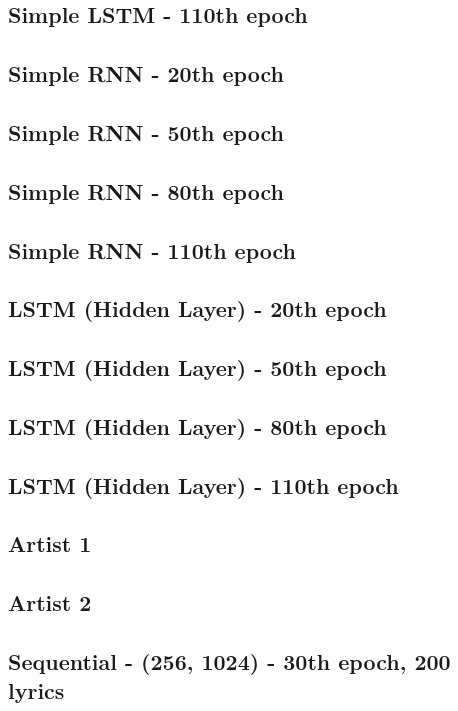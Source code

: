 \documentclass[conference]{IEEEtran}
\begin{document}
\subsection{Simple LSTM - 110th epoch}\label{LSTM110}
\subsection{Simple RNN - 20th epoch}\label{RNN20}
\subsection{Simple RNN - 50th epoch}\label{RNN50}
\subsection{Simple RNN - 80th epoch}\label{RNN80}
\subsection{Simple RNN - 110th epoch}\label{RNN110}
\subsection{LSTM (Hidden Layer) - 20th epoch}\label{HID20}
\subsection{LSTM (Hidden Layer) - 50th epoch}\label{HID50}
\subsection{LSTM (Hidden Layer) - 80th epoch}\label{HID80}
\subsection{LSTM (Hidden Layer) - 110th epoch}\label{HID110}

\subsection{Artist 1}\label{A1}
\subsection{Artist 2}\label{A2}

\subsection{Sequential - (256, 1024) - 30th epoch, 200 lyrics}\label{Sequential256_1024_200}
\end{document}
